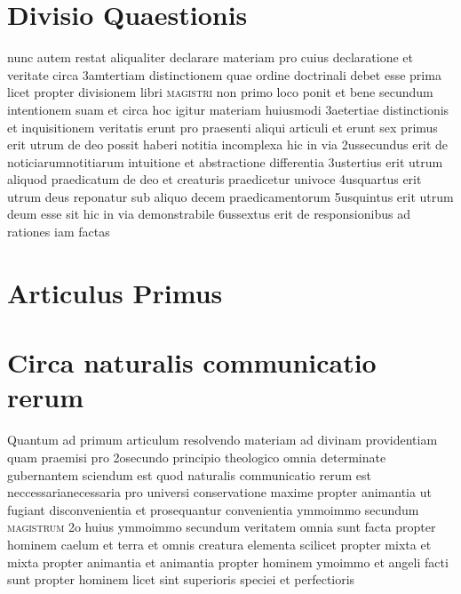 \documentclass[twoside, openright]{report}
\newcommand{\name}[1]{\textsc{#1}}
\begin{document}
         \section*{Divisio Quaestionis} 
        \pstart
        nunc autem restat aliqualiter declarare materiam pro cuius declaratione et veritate circa 3amtertiam distinctionem quae ordine doctrinali debet esse prima licet propter divisionem libri \name{magistri} non primo loco ponit et bene secundum intentionem suam et circa hoc igitur materiam huiusmodi 3aetertiae distinctionis et inquisitionem veritatis erunt pro praesenti aliqui articuli et erunt sex primus erit utrum de deo possit haberi notitia incomplexa hic in via 2ussecundus erit de noticiarumnotitiarum intuitione et abstractione differentia 3ustertius erit utrum aliquod praedicatum de deo et creaturis praedicetur univoce 4usquartus erit utrum deus reponatur sub aliquo decem praedicamentorum 5usquintus erit utrum deum esse sit hic in via demonstrabile 6ussextus erit de responsionibus ad rationes iam factas 
        \pend
      
        \bigskip
         \section*{Articulus Primus} 
        \bigskip
         \section*{Circa naturalis communicatio rerum} 
        \pstart
        Quantum ad primum articulum resolvendo materiam ad divinam providentiam quam praemisi pro 2osecundo principio theologico omnia determinate gubernantem sciendum est quod naturalis communicatio rerum est neccessarianecessaria pro universi conservatione maxime propter animantia ut fugiant disconvenientia et prosequantur convenientia ymmoimmo secundum \name{magistrum} 2o huius ymmoimmo secundum veritatem omnia sunt facta propter hominem caelum et terra et omnis creatura elementa scilicet propter mixta et mixta propter animantia et animantia propter hominem ymoimmo et angeli facti sunt propter hominem licet sint superioris speciei et perfectioris
        \pend
     
\end{document}
